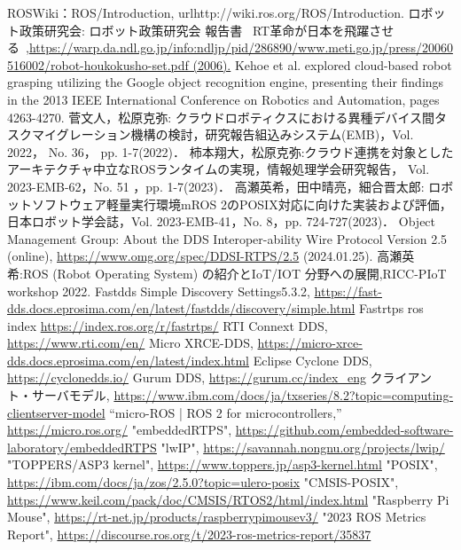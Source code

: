 
\begin{thebibliography}{99}
 ROSWiki：ROS/Introduction, url{http://wiki.ros.org/ROS/Introduction.}
 ロボット政策研究会: ロボット政策研究会 報告書 ~RT革命が日本を飛躍させる~,\url{https://warp.da.ndl.go.jp/info:ndljp/pid/286890/www.meti.go.jp/press/20060516002/robot-houkokusho-set.pdf (2006).}
 Kehoe et al. explored cloud-based robot grasping utilizing the Google object recognition engine, presenting their findings in the 2013 IEEE International Conference on Robotics and Automation, pages 4263-4270.
 菅文人，松原克弥: クラウドロボティクスにおける異種デバイス間タスクマイグレーション機構の検討，研究報告組込みシステム(EMB)，Vol. 2022， No. 36， pp. 1-7(2022)．
 柿本翔大，松原克弥:クラウド連携を対象としたアーキテクチャ中立なROSランタイムの実現，情報処理学会研究報告， Vol. 2023-EMB-62，No. 51 ，pp. 1-7(2023)．
 高瀬英希，田中晴亮，細合晋太郎: ロボットソフトウェア軽量実行環境mROS 2のPOSIX対応に向けた実装および評価，日本ロボット学会誌，Vol. 2023-EMB-41，No. 8，pp. 724-727(2023)．
 Object Management Group: About the DDS Interoper-ability Wire Protocol Version 2.5 (online), \url{https://www.omg.org/spec/DDSI-RTPS/2.5} (2024.01.25).
 高瀬英希:ROS (Robot Operating System) の紹介とIoT/IOT 分野への展開,RICC-PIoT workshop 2022.
 Fastdds Simple Discovery Settings5.3.2, \url{https://fast-dds.docs.eprosima.com/en/latest/fastdds/discovery/simple.html}
 Fastrtps ros index \url{https://index.ros.org/r/fastrtps/}
 RTI Connext DDS, \url{https://www.rti.com/en/}
Micro XRCE-DDS, \url{https://micro-xrce-dds.docs.eprosima.com/en/latest/index.html}
Eclipse Cyclone DDS, \url{https://cyclonedds.io/}
Gurum DDS, \url{https://gurum.cc/index_eng}
クライアント・サーバモデル, \url{https://www.ibm.com/docs/ja/txseries/8.2?topic=computing-clientserver-model}
 “micro-ROS | ROS 2 for microcontrollers,” \url{https://micro.ros.org/} 
 "embeddedRTPS", \url{https://github.com/embedded-software-laboratory/embeddedRTPS}
 "lwIP", \url{https://savannah.nongnu.org/projects/lwip/}
 "TOPPERS/ASP3 kernel", \url{https://www.toppers.jp/asp3-kernel.html}
 "POSIX", \url{https://ibm.com/docs/ja/zos/2.5.0?topic=ulero-posix}
 "CMSIS-POSIX", \url{https://www.keil.com/pack/doc/CMSIS/RTOS2/html/index.html}
 "Raspberry Pi Mouse", \url{https://rt-net.jp/products/raspberrypimousev3/}
 "2023 ROS Metrics Report", \url{https://discourse.ros.org/t/2023-ros-metrics-report/35837}
\end{thebibliography}